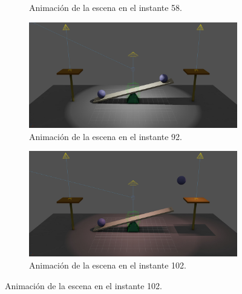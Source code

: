 \begin{figure}[H]
\begin{subfigure}[t]{0.48\textwidth}
    \caption{Animación de la escena en el instante 58.}
 \end{subfigure}
 \par\bigskip
 \begin{subfigure}[t]{0.48\textwidth}
    \centering
    \includegraphics[width=\textwidth]{imagenes/animaciones/general/92.jpg}
    \caption{Animación de la escena en el instante 92.}
 \end{subfigure}
\hfill
 \begin{subfigure}[t]{0.48\textwidth}
    \centering
    \includegraphics[width=\textwidth]{imagenes/animaciones/general/102.jpg}
    \caption{Animación de la escena en el instante 102.}
 \end{subfigure}
\end{figure}

